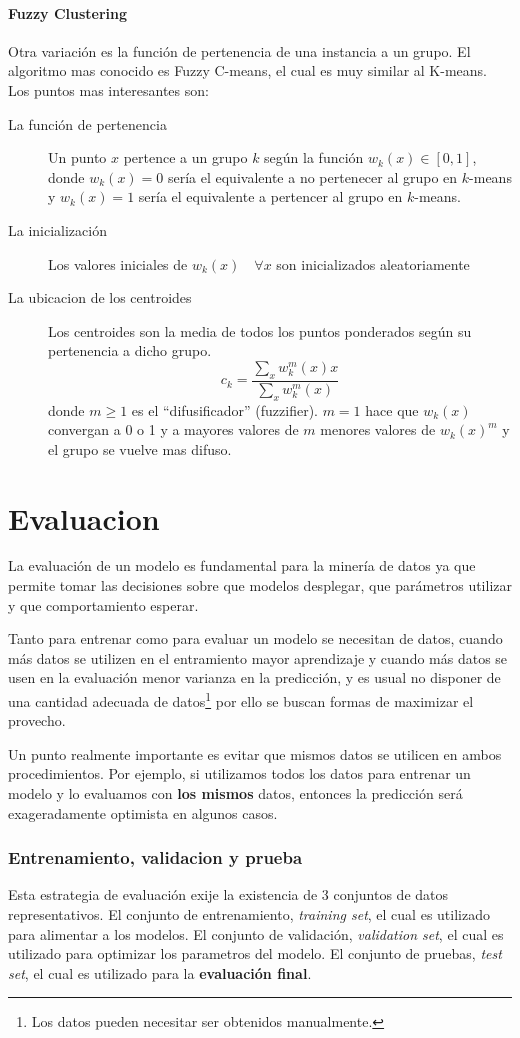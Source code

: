 \documentclass[10pt,a4paper]{article}
\begin{document}
\subsection{Fuzzy Clustering}
Otra variación es la función de pertenencia de una instancia a un grupo. El algoritmo mas conocido es Fuzzy C-means, el cual es muy similar al K-means\cite{bezdek1984fcm}. Los puntos mas interesantes son:
\begin{description}
\item[La función de pertenencia] Un punto $x$ pertence a un grupo $k$ según la función $w_k(x) \in [0, 1]$, donde $w_k(x) = 0$ sería el equivalente a no pertenecer al grupo en $k$-means y $w_k(x) = 1$ sería el equivalente a pertencer al grupo en $k$-means.
\item[La inicialización] Los valores iniciales de $w_k(x)\quad \forall x$ son inicializados aleatoriamente
\item[La ubicacion de los centroides] Los centroides son la media de todos los puntos ponderados según su pertenencia a dicho grupo.
  \[
  c_k = \frac{\sum_x w_k^m(x)x}{\sum_x w_k^m(x)}
  \]
  donde $m \geq 1$ es el ``difusificador'' (fuzzifier). $m=1$ hace que $w_k(x)$ convergan a 0 o 1 y a mayores valores de $m$ menores valores de $w_k(x)^m$ y el grupo se vuelve mas difuso.
\end{description}

\part{Evaluacion}
La evaluación de un modelo es fundamental para la minería de datos ya que permite tomar las decisiones sobre que modelos desplegar, que parámetros utilizar y que comportamiento esperar.

Tanto para entrenar como para evaluar un modelo se necesitan de datos, cuando más datos se utilizen en el entramiento mayor aprendizaje y cuando más datos se usen en la evaluación menor varianza en la predicción, y es usual no disponer de una cantidad adecuada de datos\footnote{Los datos pueden necesitar ser obtenidos manualmente.} por ello se buscan formas de maximizar el provecho.

Un punto realmente importante es evitar que mismos datos se utilicen en ambos procedimientos. Por ejemplo, si utilizamos todos los datos para entrenar un modelo y lo evaluamos con \textbf{los mismos} datos, entonces la predicción será exageradamente optimista en algunos casos. 

\section{Entrenamiento, validacion y prueba} %
Esta estrategia de evaluación exije la existencia de 3 conjuntos de datos representativos. El conjunto de entrenamiento, \textit{training set}, el cual es utilizado para alimentar a los modelos. El conjunto de validación, \textit{validation set}, el cual es utilizado para optimizar los parametros del modelo. El conjunto de pruebas, \textit{test set}, el cual es utilizado para la \textbf{evaluación final}.
\end{document}
